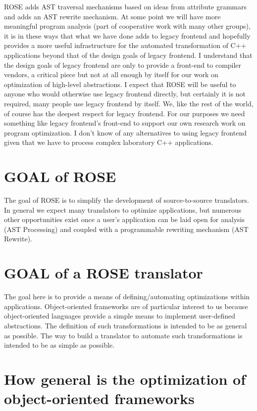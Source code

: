    ROSE adds AST traversal mechanisms based on ideas from attribute grammars
and adds an AST rewrite mechanism.  At some point we will have more meaningful
program analysis (part of cooperative work with many other groups), it is in 
these ways that what we have done adds to legacy frontend and
hopefully provides a more useful infrastructure for the automated transformation of
C++ applications beyond that of the design goals of legacy frontend.  I understand that the
design goals of legacy frontend are only to provide a front-end to compiler vendors, a critical
piece but not at all enough by itself for our work on optimization of high-level 
abstractions.  I expect that ROSE will be useful to anyone who would otherwise use 
legacy frontend directly, but certainly it is not required, many people use legacy frontend by itself.
We, like the rest of the world, of course has the deepest respect for legacy frontend.
For our purposes we need something like legacy frontend's front-end to support our own research work
on program optimization. I don't know of any alternatives to using legacy frontend given that 
we have to process complex laboratory C++ applications.

\section{GOAL of ROSE}
   The goal of ROSE is to simplify the development of source-to-source translators.
In general we expect many translators to optimize applications, but numerous
other opportunities exist once a user's application can be laid open for analysis
(AST Processing) and coupled with a programmable rewriting mechanism (AST Rewrite).

\section{GOAL of a ROSE translator}

   The goal here is to provide a means of defining/automating optimizations within
applications. Object-oriented frameworks are of particular interest to us because object-oriented
languages provide a simple means to implement user-defined abstractions.
The definition of such transformations is intended to be as general
as possible. The way to build a translator to automate such transformations
is intended to be as simple as possible.

\section{ How general is the optimization of object-oriented frameworks }


